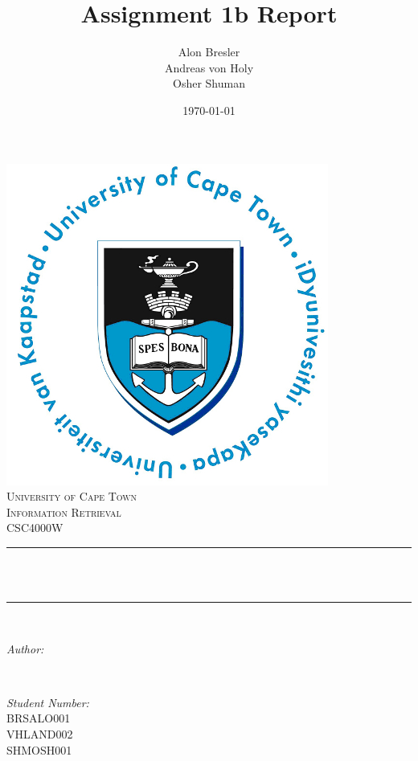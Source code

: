 \documentclass[11pt]{article}
\title{Assignment 1b Report}								%
\author{Alon Bresler\\Andreas von Holy\\Osher Shuman}								%
\date{\today}											%
\makeatletter
\let\thetitle\@title
\let\theauthor\@author
\let\thedate\@date
\makeatother
\begin{document}

\begin{titlepage}
	\centering
    \vspace*{0.5 cm}
    \includegraphics[scale = 0.75]{UCT.jpg}\\[1.0 cm]	%
    \textsc{\LARGE University of Cape Town}\\[2.0 cm]	%
	\textsc{\Large Information Retrieval}\\[0.5 cm]				%
	\textsc{\large CSC4000W}\\[0.5 cm]				%
	\rule{\linewidth}{0.2 mm} \\[0.4 cm]
	{ \huge \bfseries \thetitle}\\
	\rule{\linewidth}{0.2 mm} \\[1.5 cm]
	
	\begin{minipage}{0.4\textwidth}
		\begin{flushleft} \large
			\emph{Author:}\\
			\theauthor
			\end{flushleft}
			\end{minipage}~
			\begin{minipage}{0.4\textwidth}
			\begin{flushright} \large
			\emph{Student Number:} \\
			BRSALO001\\VHLAND002\\SHMOSH001									%
		\end{flushright}
	\end{minipage}\\[2 cm]
	
	{\large \thedate}\\[2 cm]
 
	\vfill
	
\end{titlepage}
\end{document}
